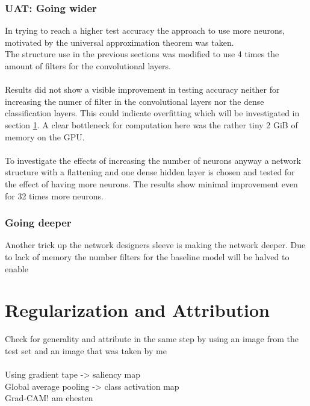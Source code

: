 \documentclass{article}
\begin{document}
\begin{multicols}{2}
\subsubsection{UAT: Going wider}
In trying to reach a higher test accuracy the approach to use more neurons, motivated by the universal approximation theorem was taken.\\
The structure use in the previous sections was modified to use 4 times the amount of filters for the convolutional layers.\\
\\
Results did not show a visible improvement in testing accuracy neither for increasing the numer of filter in the convolutional layers nor the dense classification layers. This could indicate overfitting which will be investigated in section \ref{regularization}. A clear bottleneck for computation here was the rather tiny 2 GiB of memory on the GPU.\\
\\
To investigate the effects of increasing the number of neurons anyway a network structure with a flattening and one dense hidden layer is chosen and tested for the effect of having more neurons. The results show minimal improvement even for 32 times more neurons.

\subsubsection{Going deeper}
Another trick up the network designers sleeve is making the network deeper. Due to lack of memory the number filters for the baseline model will be halved to enable 

\section{Regularization and Attribution}
\label{regularization}
Check for generality and attribute in the same step by using an image from the test set and an image that was taken by me\\
\\
Using gradient tape -> saliency map\\
Global average pooling -> class activation map\\
Grad-CAM! am ehesten

\end{multicols}
\end{document}
